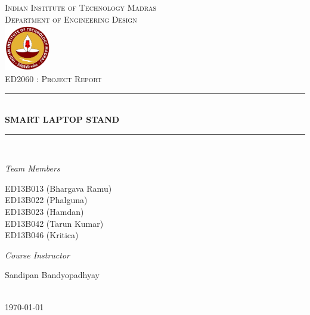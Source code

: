\newcommand{\HRule}{\rule{\linewidth}{0.5mm}} 

\begin{titlepage}
\center
\textsc{
\Huge{Indian Institute of Technology Madras}\\[.5cm]
\Large
Department of Engineering Design\\[1cm] 
\includegraphics[width=2cm]{logo}\\[3cm]
ED2060 : Project Report}\\[.5cm] 

\sffamily
\HRule \\[0.4cm]
\textbf{\Huge SMART LAPTOP STAND}\\[0.2cm] 
\HRule \\[3cm]
 
\large
\begin{minipage}[t]{.4\textwidth}
\begin{flushleft}
\emph{Team Members}

ED13B013 (Bhargava Ramu)\\
ED13B022 (Phalguna)\\
ED13B023 (Hamdan)\\
ED13B042 (Tarun Kumar)\\
ED13B046 (Kritica)\\
\end{flushleft}

\end{minipage}\hfill\begin{minipage}[t]{.4\textwidth}

\begin{flushright}
\emph{Course Instructor} 

Sandipan Bandyopadhyay\\ 

\end{flushright}
\end{minipage}
\\[2cm]

{\today}\\[3cm]

\end{titlepage}


